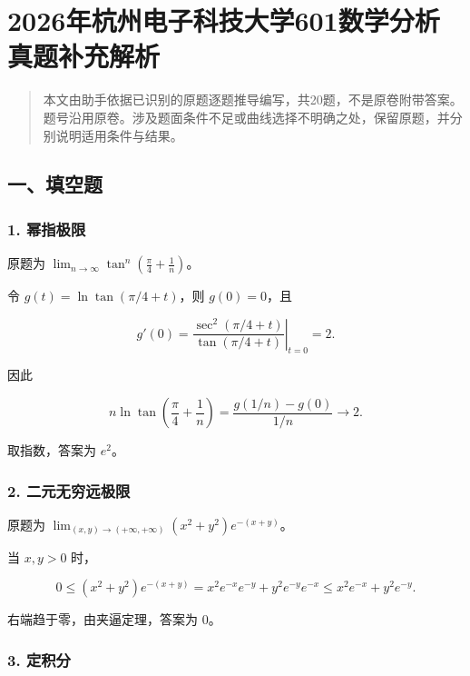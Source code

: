 \documentclass[11pt,fontset=fandol]{ctexart}
\begin{document}
\section{2026年杭州电子科技大学601数学分析真题补充解析}\label{ux5e74ux676dux5ddeux7535ux5b50ux79d1ux6280ux5927ux5b66601ux6570ux5b66ux5206ux6790ux771fux9898ux8865ux5145ux89e3ux6790}

\begin{quote}
本文由助手依据已识别的原题逐题推导编写，共20题，不是原卷附带答案。题号沿用原卷。涉及题面条件不足或曲线选择不明确之处，保留原题，并分别说明适用条件与结果。
\end{quote}

\subsection{一、填空题}\label{ux4e00ux586bux7a7aux9898}

\subsubsection{1. 幂指极限}\label{ux5e42ux6307ux6781ux9650}

原题为
\(\displaystyle\lim_{n\to\infty}\tan^n\left(\frac\pi4+\frac1n\right)\)。

令 \(g(t)=\ln\tan(\pi/4+t)\)，则 \(g(0)=0\)，且

\[
g'(0)=\left.\frac{\sec^2(\pi/4+t)}{\tan(\pi/4+t)}\right|_{t=0}=2.
\]

因此

\[
n\ln\tan\left(\frac\pi4+\frac1n\right)
=\frac{g(1/n)-g(0)}{1/n}\longrightarrow2.
\]

取指数，答案为 \(\boxed{e^2}\)。

\subsubsection{2.
二元无穷远极限}\label{ux4e8cux5143ux65e0ux7a77ux8fdcux6781ux9650}

原题为
\(\displaystyle\lim_{(x,y)\to(+\infty,+\infty)}(x^2+y^2)e^{-(x+y)}\)。

当 \(x,y>0\) 时，

\[
0\le(x^2+y^2)e^{-(x+y)}
=x^2e^{-x}e^{-y}+y^2e^{-y}e^{-x}
\le x^2e^{-x}+y^2e^{-y}.
\]

右端趋于零，由夹逼定理，答案为 \(\boxed0\)。

\subsubsection{3. 定积分}\label{ux5b9aux79efux5206}
\end{document}
